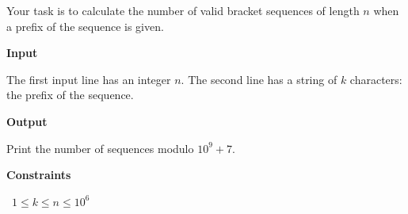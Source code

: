 Your task is to calculate the number of valid bracket sequences of length $n$ when a prefix of the sequence is given.

\vspace{0.3cm}\noindent\textbf{Input}

The first input line has an integer $n$.
The second line has a string of $k$ characters: the prefix of the sequence.

\vspace{0.3cm}\noindent\textbf{Output}

Print the number of sequences modulo $10^9+7$.

\vspace{0.3cm}\noindent\textbf{Constraints}

\textbullet\ $1 \le k \le n \le 10^6$